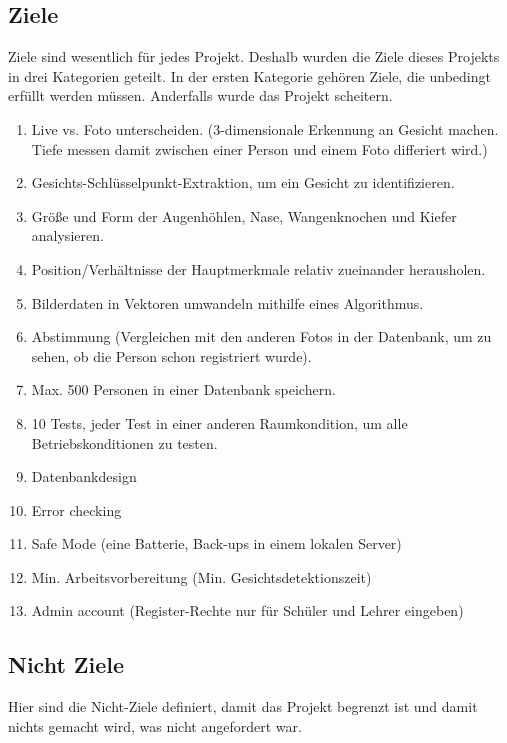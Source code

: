 \subsection{Ziele}
Ziele sind wesentlich für jedes Projekt. Deshalb wurden die Ziele dieses Projekts in drei Kategorien geteilt.
In der ersten Kategorie gehören Ziele, die unbedingt erfüllt werden müssen. Anderfalls wurde das Projekt scheitern.
\begin{enumerate}
	\item Live vs. Foto unterscheiden.
	(3-dimensionale Erkennung an Gesicht machen. Tiefe messen damit zwischen einer Person und einem Foto differiert wird.)
	
	\item Gesichts-Schlüsselpunkt-Extraktion, um ein Gesicht zu identifizieren.
	
	\item Größe und Form der Augenhöhlen, Nase, Wangenknochen und Kiefer analysieren.
	
	\item Position/Verhältnisse der Hauptmerkmale relativ zueinander herausholen.
	
	\item Bilderdaten in Vektoren umwandeln mithilfe eines Algorithmus.
	
	\item Abstimmung (Vergleichen mit den anderen Fotos in der Datenbank, um zu sehen, ob die Person schon registriert wurde).
	
	\item Max. 500 Personen in einer Datenbank speichern.
	
	\item 10 Tests, jeder Test in einer anderen Raumkondition, um    alle Betriebskonditionen zu testen.
	
	\item Datenbankdesign
	
	\item Error checking
	
	\item Safe Mode (eine Batterie, Back-ups in einem lokalen Server)
	
	\item Min. Arbeitsvorbereitung (Min. Gesichtsdetektionszeit)
	\item Admin account (Register-Rechte nur für Schüler und Lehrer eingeben)
	
\end{enumerate}
\subsection{Nicht Ziele}
Hier sind die Nicht-Ziele definiert, damit das Projekt begrenzt ist und damit nichts gemacht wird, was nicht angefordert war.

